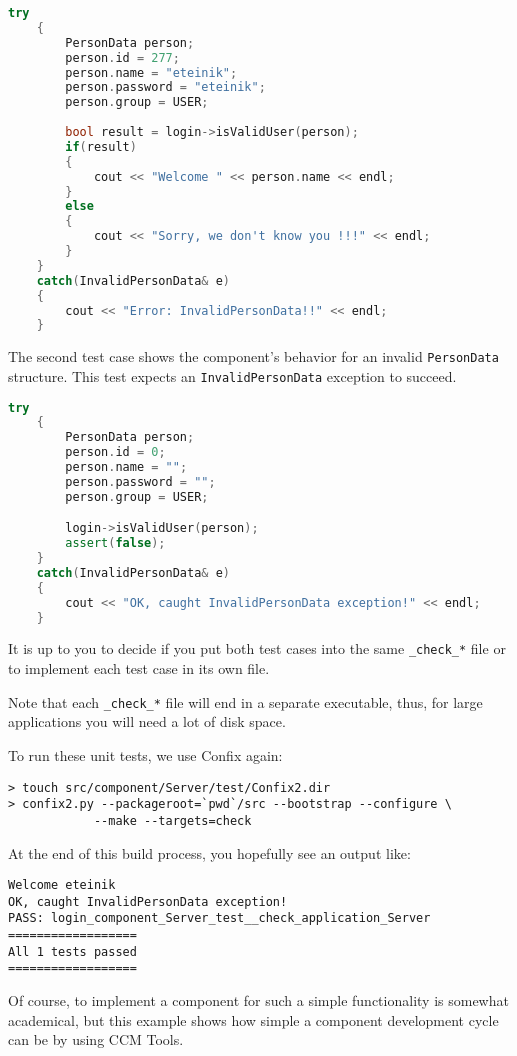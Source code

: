 \begin{footnotesize}
\begin{lstlisting}[language=C++]
    try 
    {
        PersonData person;
        person.id = 277;
        person.name = "eteinik";
        person.password = "eteinik";
        person.group = USER;
	
        bool result = login->isValidUser(person);
        if(result) 
        {
            cout << "Welcome " << person.name << endl;
        }
        else 
        {
            cout << "Sorry, we don't know you !!!" << endl;
        }
    }
    catch(InvalidPersonData& e) 
    {
        cout << "Error: InvalidPersonData!!" << endl;
    }
\end{lstlisting}
\end{footnotesize}

The second test case shows the component's behavior for an invalid 
{\tt PersonData} structure. This test expects an {\tt InvalidPersonData}
exception to succeed.

\begin{footnotesize}
\begin{lstlisting}[language=C++]
    try 
    {
        PersonData person;
        person.id = 0;
        person.name = "";
        person.password = "";
        person.group = USER;

        login->isValidUser(person);
        assert(false);
    }
    catch(InvalidPersonData& e) 
    {
        cout << "OK, caught InvalidPersonData exception!" << endl;
    }
\end{lstlisting}
\end{footnotesize}

It is up to you to decide if you put both test cases into the same {\tt \_check\_*}
file or to implement each test case in its own file.

\vspace{3mm}
Note that each {\tt \_check\_*} file will end in a separate executable, thus,
for large applications you will need a lot of disk space.

\vspace{3mm}
To run these unit tests, we use Confix again:
\begin{footnotesize}
\begin{verbatim}
> touch src/component/Server/test/Confix2.dir
> confix2.py --packageroot=`pwd`/src --bootstrap --configure \
            --make --targets=check 
\end{verbatim}
\end{footnotesize}

At the end of this build process, you hopefully see an output like:
\begin{footnotesize}
\begin{verbatim}
Welcome eteinik
OK, caught InvalidPersonData exception!
PASS: login_component_Server_test__check_application_Server
==================
All 1 tests passed
==================
\end{verbatim}
\end{footnotesize}

Of course, to implement a component for such a simple functionality is somewhat
academical, but this example shows how simple a component development cycle can
be by using CCM Tools. 

\newpage
